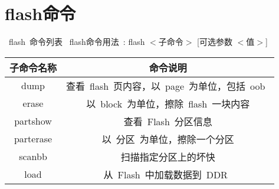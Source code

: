 \section{flash命令}
~flash~命令列表
~flash命令用法~: flash $<$子命令$>$ [可选参数 $<$值$>$]
\begin{table}[htbp]
\setlength{\parindent}{0pt}
\begin{tabular}{|c|c|} \hline
\small 子命令名称 & \small 命令说明 \\
\hline
  dump &   查看~flash~页内容，以~page~为单位，包括~oob~ \\
\hline
  erase &   以~block~为单位，擦除~flash~一块内容 \\
\hline
 partshow &  查看~Flash~分区信息 \\
\hline
  parterase &   以~分区~为单位，擦除一个分区 \\
\hline
  scanbb &   扫描指定分区上的坏快 \\
\hline
  load &   从~Flash~中加载数据到~DDR~ \\
\hline
\end{tabular}
\end{table}

